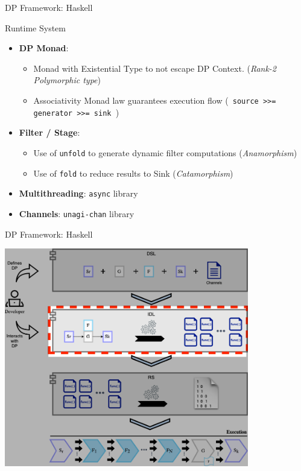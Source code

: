 \documentclass{beamer}
\begin{document}
  \begin{frame}[fragile]{DP Framework: Haskell}
  \begin{block}{Runtime System}
    \begin{itemize}
      \item \textbf{DP Monad}:
      \begin{itemize} 
      \item Monad with Existential Type to not escape DP Context. (\textit{Rank-2 Polymorphic type})
      \item Associativity Monad law guarantees execution flow (\texttt{ source >>= generator >>= sink }) 
      \end{itemize}
    \item \textbf{Filter / Stage}: 
      \begin{itemize}
        \item Use of \texttt{unfold} to generate dynamic filter computations (\textit{Anamorphism})
        \item Use of \texttt{fold} to reduce results to Sink (\textit{Catamorphism})
      \end{itemize}
      \item \textbf{Multithreading}: \texttt{async} library
      \item \textbf{Channels}: \texttt{unagi-chan} library
    \end{itemize}
  \end{block}
  \end{frame}

  \begin{frame}[fragile]{DP Framework: Haskell}
    \begin{center}
      \includegraphics[width = 0.8\textwidth, height = 0.8\textheight]{dpf_haskell_v3-2}
    \end{center}
  \end{frame}
\end{document}
